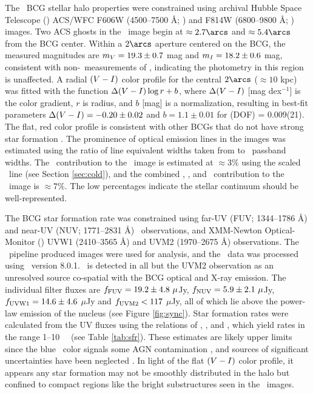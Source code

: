 \documentclass[11pt, preprint]{aastex}
\begin{document}
The \rbs\ BCG stellar halo properties were constrained using archival
Hubble Space Telescope (\hst) ACS/WFC F606W (4500--7500 \AA; \myv) and
F814W (6800--9800 \AA; \myi) images. Two ACS ghosts \citep{acsghost}
in the \myi\ image begin at $\approx 2.7\arcs$ and $\approx 5.4\arcs$
from the BCG center. Within a $2\arcs$ aperture centered on the BCG,
the measured magnitudes are $m_{V} = 19.3 \pm 0.7$ mag and
$m_{I} = 18.2 \pm 0.6$ mag, consistent with non-\hst\ measurements
of \citet{rbs1}, indicating the photometry in this region is
unaffected. A radial $(V-I)$ color profile for the central
$2\arcs$ ($\approx 10$ kpc) was fitted with the function
$\Delta(V-I) \log r + b$, where $\Delta(V-I)$ [mag
  dex$^{-1}$] is the color gradient, $r$ is radius, and $b$ [mag] is a
normalization, resulting in best-fit parameters $\Delta(V-I) =
-0.20 \pm 0.02$ and $b = 1.1 \pm 0.01$ for \chisq(DOF) =
0.009(21). The flat, red color profile is consistent with other BCGs
that do not have strong star formation \citep[\eg][]{rafferty06}. The
prominence of optical emission lines in the images was estimated using
the ratio of line equivalent widths taken from \citet{rbs1} to
\hst\ passband widths. The \halpha\ contribution to the \myi\ image is
estimated at $\approx 3\%$ using the scaled \hbeta\ line (see Section
\ref{sec:cold}), and the combined \hbeta, \oii, and
\oiii\ contribution to the \myv\ image is $\approx 7\%$. The low
percentages indicate the stellar continuum should be well-represented.

The BCG star formation rate was constrained using far-UV (FUV;
1344--1786 \AA) and near-UV (NUV; 1771--2831 \AA)
\galex\ observations, and XMM-Newton Optical-Monitor (\xom) UVW1
(2410--3565 \AA) and UVM2 (1970--2675 \AA) observations. The
\galex\ pipeline produced images were used for analysis, and the
\xom\ data was processed using \sas\ version 8.0.1. \rbs\ is detected
in all but the UVM2 observation as an unresolved source co-spatial
with the BCG optical and X-ray emission. The individual filter fluxes
are $f_{\rm{FUV}} = 19.2 \pm 4.8 ~\mu$Jy, $f_{\rm{NUV}} = 5.9 \pm 2.1
~\mu$Jy, $f_{\rm{UVW1}} = 14.6 \pm 4.6$ $\mu$Jy and $f_{\rm{UVM2}} <
117$ $\mu$Jy, all of which lie above the power-law emission of the
nucleus (see Figure \ref{fig:sync}). Star formation rates were
calculated from the UV fluxes using the relations of
\citet{kennicutt2}, \citet{2006ApJ...642..775M}, and
\citet{salim2007}, which yield rates in the range 1--10 ~\msolpy\ (see
Table \ref{tab:sfr}). These estimates are likely upper limits since
the blue \galex\ color signals some AGN contamination
\citep{2005AJ....130.1022A}, and sources of significant uncertainties
have been neglected \citep[\eg][]{1992ApJ...388..310K,
  2004AJ....127.2002K, hicksuv, 2010MNRAS.tmp..626G}. In light of the
flat $(V-I)$ color profile, it appears any star formation may
not be smoothly distributed in the halo but confined to compact
regions like the bright substructures seen in the \hst\ images.
\end{document}
